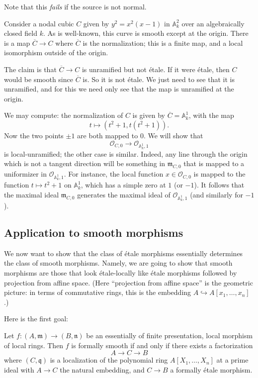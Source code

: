 Note that this \emph{fails} if the source is not normal.
\begin{example} 
Consider a nodal cubic $C$ given by $y^2 = x^2 (x-1)$ in $\mathbb{A}^2_k$ over an
algebraically closed field $k$. As is well-known, this curve is smooth except
at the origin. There is a map $\overline{C} \to C$ where $\overline{C}$ is
the normalization; this is a finite map, and a local isomorphism outside of
the origin. 

The claim is that $\overline{C} \to C$ is unramified but not \'etale. If it
were \'etale, then $C$ would be smooth since $\overline{C}$ is. So it is not
\'etale. We just need to see that it is unramified, and for this we need only
see that the map is unramified at the origin.

We may compute: the normalization of $C$ is given by $\overline{C} =
\mathbb{A}^1_k$, with the map
\[ t \mapsto (t^2+1, t (t^2 + 1)).  \]
Now the two points $\pm 1$ are both mapped to $0$.
We will show that
\[ \mathcal{O}_{C, 0} \to \mathcal{O}_{\mathbb{A}^1_k, 1}  \]
is local-unramified; the other case is similar.
Indeed, any line through the origin which is not a tangent direction will be
something in $\mathfrak{m}_{C, 0}$ that is mapped to a uniformizer in $
\mathcal{O}_{\mathbb{A}^1_k, 1}$.
For instance, the local function $x \in \mathcal{O}_{C,0}$ is mapped to 
the function $t \mapsto t^2 + 1$ on $\mathbb{A}^1_k$, which has a simple zero
at $1$ (or $-1$).
It follows that the maximal ideal $\mathfrak{m}_{C,0}$ generates the maximal
ideal of $\mathcal{O}_{\mathbb{A}^1_k, 1}$ (and similarly for $-1$).
\end{example} 

\subsection{Application to smooth morphisms}

We now want to show that the class of \'etale morphisms essentially determines
the class of smooth morphisms. Namely, we are going to show that 
smooth morphisms are those that look \'etale-locally like \'etale morphisms
followed by projection from affine space. (Here ``projection from affine
space'' is the geometric picture: in terms of commutative rings, this is the
embedding $A \hookrightarrow A[x_1, \dots, x_n]$.)

Here is the first goal:
\begin{theorem} 
Let $f: (A, \mathfrak{m}) \to (B, \mathfrak{n})$ be an essentially of finite
presentation, local morphism of local rings.
Then $f$ is formally smooth
if and only if there exists a factorization
\[ A \to C \to B  \]
where $(C, \mathfrak{q})$ is a localization of the polynomial ring $A[X_1,
\dots, X_n]$ at a prime ideal with $A \to C$ the natural embedding, and $C \to
B$ a formally \'etale morphism.
\end{theorem} 

